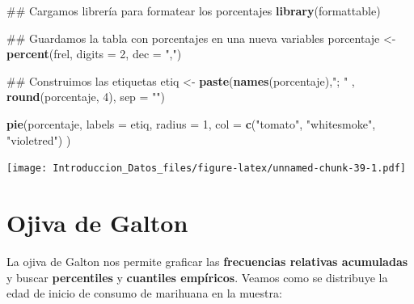 \documentclass[spanish,]{book}
\newenvironment{Shaded}{\begin{snugshade}}{\end{snugshade}}
\newcommand{\KeywordTok}[1]{\textcolor[rgb]{0.13,0.29,0.53}{\textbf{#1}}}
\newcommand{\DataTypeTok}[1]{\textcolor[rgb]{0.13,0.29,0.53}{#1}}
\newcommand{\DecValTok}[1]{\textcolor[rgb]{0.00,0.00,0.81}{#1}}
\newcommand{\StringTok}[1]{\textcolor[rgb]{0.31,0.60,0.02}{#1}}
\newcommand{\OperatorTok}[1]{\textcolor[rgb]{0.81,0.36,0.00}{\textbf{#1}}}
\newcommand{\NormalTok}[1]{#1}
\begin{document}
\begin{Shaded}
\begin{Highlighting}[]
\NormalTok{## Cargamos librería para formatear los porcentajes}
\KeywordTok{library}\NormalTok{(formattable)}

\NormalTok{## Guardamos la tabla con porcentajes en una nueva variables}
\NormalTok{porcentaje <-}\StringTok{ }\KeywordTok{percent}\NormalTok{(frel, }\DataTypeTok{digits =} \DecValTok{2}\NormalTok{, }\DataTypeTok{dec =} \StringTok{","}\NormalTok{)}

\NormalTok{## Construimos las etiquetas}
\NormalTok{etiq <-}\StringTok{ }\KeywordTok{paste}\NormalTok{(}\KeywordTok{names}\NormalTok{(porcentaje),}\StringTok{"; "}\NormalTok{ , }\KeywordTok{round}\NormalTok{(porcentaje, }\DecValTok{4}\NormalTok{), }\DataTypeTok{sep =} \StringTok{""}\NormalTok{)}

\KeywordTok{pie}\NormalTok{(porcentaje,}
    \DataTypeTok{labels =}\NormalTok{ etiq,}
    \DataTypeTok{radius =} \DecValTok{1}\NormalTok{,}
    \DataTypeTok{col =} \KeywordTok{c}\NormalTok{(}\StringTok{"tomato"}\NormalTok{, }\StringTok{"whitesmoke"}\NormalTok{, }\StringTok{"violetred"}\NormalTok{)}
\NormalTok{    )}
\end{Highlighting}
\end{Shaded}

\texttt{[image: Introduccion\_Datos\_files/figure-latex/unnamed-chunk-39-1.pdf]}

\section{Ojiva de Galton}\label{ojiva-de-galton}

La ojiva de Galton nos permite graficar las \textbf{frecuencias
relativas acumuladas} y buscar \textbf{percentiles} y \textbf{cuantiles
empíricos}. Veamos como se distribuye la edad de inicio de consumo de
marihuana en la muestra:

\begin{Shaded}
\end{Shaded}
\end{document}
